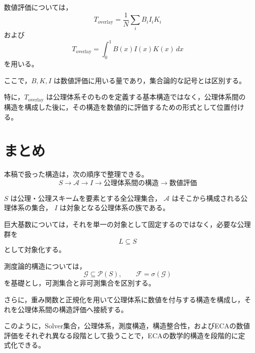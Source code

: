 \documentclass[12pt,a4paper]{article}
\begin{document}
数値評価については，
\[
T_{\mathrm{overlay}}
=
\frac{1}{N}
\sum_i B_iI_iK_i
\]
および
\[
T_{\mathrm{overlay}}
=
\int_0^1B(x)I(x)K(x)\,dx
\]
を用いる。

ここで，$B,K,I$ は数値評価に用いる量であり，集合論的な記号とは区別する。

特に，$T_{\mathrm{overlay}}$ は公理体系そのものを定義する基本構造ではなく，公理体系間の構造を構成した後に，その構造を数値的に評価するための形式として位置付ける。

\section{まとめ}

本稿で扱った構造は，次の順序で整理できる。
\[
\boxed{
S
\longrightarrow
\mathscr A
\longrightarrow
I
\longrightarrow
\text{公理体系間の構造}
\longrightarrow
\text{数値評価}
}
\]

$S$ は公理・公理スキームを要素とする全公理集合，
$\mathscr A$ はそこから構成される公理体系の集合，
$I$ は対象となる公理体系の族である。

巨大基数については，それを単一の対象として固定するのではなく，必要な公理群を
\[
L\subseteq S
\]
として対象化する。

測度論的構造については，
\[
\mathcal G\subseteq\mathcal P(S),
\qquad
\mathcal F=\sigma(\mathcal G)
\]
を基礎とし，可測集合と非可測集合を区別する。

さらに，重み関数と正規化を用いて公理体系に数値を付与する構造を構成し，それを公理体系間の構造評価へ接続する。

このように，Solver集合，公理体系，測度構造，構造整合性，およびECAの数値評価をそれぞれ異なる段階として扱うことで，ECAの数学的構造を段階的に定式化できる。
\end{document}
